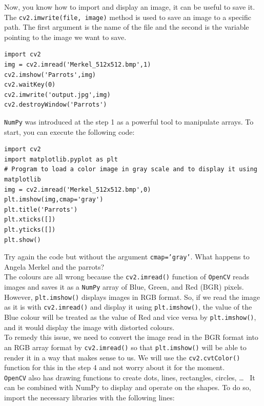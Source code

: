 \documentclass{labo}
\newcommand{\numpy}{\texttt{NumPy} }
\newcommand{\opencv}{\texttt{OpenCV} }
\begin{document}
Now, you know how to import and display an image, it can be useful to save it.
The \texttt{cv2.imwrite(file, image)} method is used to save an image to a specific path. The first argument is the name of the file and the second is the variable pointing to the image we want to save.

\begin{verbatim}
import cv2
img = cv2.imread('Merkel_512x512.bmp',1)
cv2.imshow('Parrots',img)
cv2.waitKey(0)
cv2.imwrite('output.jpg',img)
cv2.destroyWindow('Parrots')
\end{verbatim}


\numpy was introduced at the step 1 as a powerful tool to manipulate arrays. To start, you can execute the following code:

\begin{verbatim}
import cv2
import matplotlib.pyplot as plt
# Program to load a color image in gray scale and to display it using matplotlib
img = cv2.imread('Merkel_512x512.bmp',0)
plt.imshow(img,cmap='gray')
plt.title('Parrots')
plt.xticks([])
plt.yticks([])
plt.show()
\end{verbatim}

Try again the code but without the argument \texttt{cmap=’gray’}. What happens to Angela Merkel and the parrots?\\

The colours are all wrong because the \texttt{cv2.imread()} function of \opencv reads images and saves it as a \numpy array of Blue, Green, and Red (BGR) pixels.\\

However, \texttt{plt.imshow()} displays images in RGB format. So, if we read the image as it is with \texttt{cv2.imread()} and display it using \texttt{plt.imshow()}, the value of the Blue colour will be treated as the value of Red and vice versa by \texttt{plt.imshow()}, and it would display the image with distorted colours.\\

To remedy this issue, we need to convert the image read in the BGR format into an RGB array format by \texttt{cv2.imread()} so that \texttt{plt.imshow()} will be able to render it in a way that makes sense to us. We will use the \texttt{cv2.cvtColor()} function for this in the step 4 and not worry about it for the moment.\\

\opencv also has drawing functions to create dots, lines, rectangles, circles, \dots~  It can be combined with NumPy to display and operate on the shapes. To do so, import the necessary libraries with the following lines:
\end{document}

